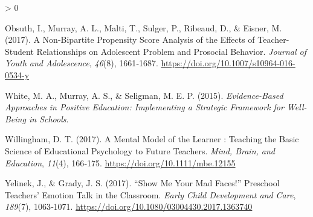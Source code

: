 \documentclass[
  french,
]{article}
\newlength{\cslhangindent}
\newenvironment{CSLReferences}[2] %
 {%
  \setlength{\parindent}{0pt}
  \ifodd #1 \everypar{\setlength{\hangindent}{\cslhangindent}}\ignorespaces\fi
  \ifnum #2 > 0
  \setlength{\parskip}{#2\baselineskip}
  \fi
 }%
 {}
\begin{document}
\begin{CSLReferences}{1}{0}
\leavevmode\hypertarget{ref-obsuth2017}{}%
Obsuth, I., Murray, A. L., Malti, T., Sulger, P., Ribeaud, D., \& Eisner, M. (2017). A {Non}-Bipartite {Propensity Score Analysis} of the {Effects} of {Teacher}-{Student Relationships} on {Adolescent Problem} and {Prosocial Behavior}. \emph{Journal of Youth and Adolescence}, \emph{46}(8), 1661‑1687. \url{https://doi.org/10.1007/s10964-016-0534-y}

\leavevmode\hypertarget{ref-white2015a}{}%
White, M. A., Murray, A. S., \& Seligman, M. E. P. (2015). \emph{Evidence-Based Approaches in Positive Education: Implementing a Strategic Framework for Well-Being in Schools}.

\leavevmode\hypertarget{ref-willingham2017}{}%
Willingham, D. T. (2017). A {Mental Model} of the {Learner} : {Teaching} the {Basic Science} of {Educational Psychology} to {Future Teachers}. \emph{Mind, Brain, and Education}, \emph{11}(4), 166‑175. \url{https://doi.org/10.1111/mbe.12155}

\leavevmode\hypertarget{ref-yelinek2017}{}%
Yelinek, J., \& Grady, J. S. (2017). {``{Show} Me Your Mad Faces!''} Preschool Teachers' Emotion Talk in the Classroom. \emph{Early Child Development and Care}, \emph{189}(7), 1063‑1071. \url{https://doi.org/10.1080/03004430.2017.1363740}

\end{CSLReferences}
\end{document}
